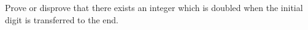 Prove or disprove that there exists an integer which is doubled when the initial digit is transferred to the end.